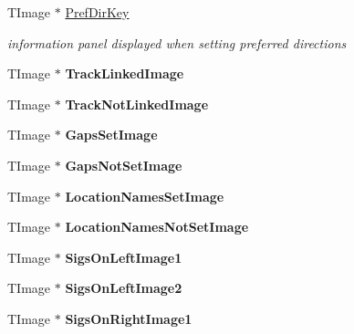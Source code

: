 \begin{DoxyCompactItemize}
\mbox{\label{class_t_interface_a0183d2bace5c2b3f7a9e3a516c3d8f4b}} 
T\+Image $\ast$ \mbox{\hyperlink{class_t_interface_a0183d2bace5c2b3f7a9e3a516c3d8f4b}{Pref\+Dir\+Key}}
\begin{DoxyCompactList}\small\item\em information panel displayed when setting preferred directions \end{DoxyCompactList}\item 
\mbox{\label{class_t_interface_acda1eb5d85f40910fcda4b4580be1f7b}} 
T\+Image $\ast$ {\bfseries Track\+Linked\+Image}
\item 
\mbox{\label{class_t_interface_a9ca92690298b34e92e2dc6ddd7626e1d}} 
T\+Image $\ast$ {\bfseries Track\+Not\+Linked\+Image}
\item 
\mbox{\label{class_t_interface_ac8fe7340879483fb2d01c256b944cfe3}} 
T\+Image $\ast$ {\bfseries Gaps\+Set\+Image}
\item 
\mbox{\label{class_t_interface_a3a2fab162e83f83720f240764dc92333}} 
T\+Image $\ast$ {\bfseries Gaps\+Not\+Set\+Image}
\item 
\mbox{\label{class_t_interface_a34a433c061f54ec17338ac77fd374426}} 
T\+Image $\ast$ {\bfseries Location\+Names\+Set\+Image}
\item 
\mbox{\label{class_t_interface_aa46ab1c5f1a9ba7f2c23a5d6df8acbfc}} 
T\+Image $\ast$ {\bfseries Location\+Names\+Not\+Set\+Image}
\item 
\mbox{\label{class_t_interface_acb8e1965431c8b870c85ac7e26d9dc0c}} 
T\+Image $\ast$ {\bfseries Sigs\+On\+Left\+Image1}
\item 
\mbox{\label{class_t_interface_a572d257b09fb31bbda34a3b4e796467b}} 
T\+Image $\ast$ {\bfseries Sigs\+On\+Left\+Image2}
\item 
\mbox{\label{class_t_interface_a4e5cfb81979cedfbad1a4ef33c38a2d6}} 
T\+Image $\ast$ {\bfseries Sigs\+On\+Right\+Image1}
\item 

\end{DoxyCompactItemize}
